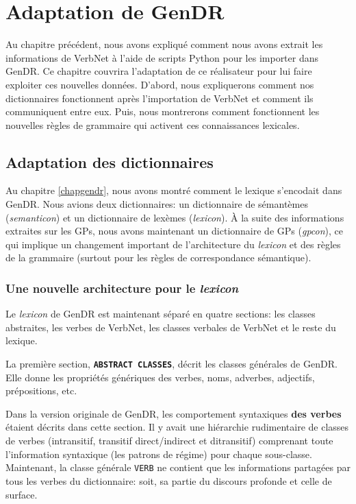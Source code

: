 
\chapter{Adaptation de GenDR}\label{ch:implementation}

Au chapitre précédent, nous avons expliqué comment nous avons extrait les informations de VerbNet à l'aide de scripts Python pour les importer dans GenDR. Ce chapitre couvrira l'adaptation de ce réalisateur pour lui faire exploiter ces nouvelles données. D'abord, nous expliquerons comment nos dictionnaires fonctionnent après l'importation de VerbNet et comment ils communiquent entre eux. Puis, nous montrerons comment fonctionnent les nouvelles règles de grammaire qui activent ces connaissances lexicales.

\section{Adaptation des dictionnaires}

Au chapitre \ref{chapgendr}, nous avons montré comment le lexique s'encodait dans GenDR. Nous avions deux dictionnaires: un dictionnaire de sémantèmes (\emph{semanticon}) et un dictionnaire de lexèmes (\emph{lexicon}). À la suite des informations extraites sur les \acp{GP}, nous avons maintenant un dictionnaire de \acp{GP} (\emph{gpcon}), ce qui implique un changement important de l'architecture du \emph{lexicon} et des règles de la grammaire (surtout pour les règles de correspondance sémantique).

\subsection{Une nouvelle architecture pour le \emph{lexicon}}

Le \emph{lexicon} de GenDR est maintenant séparé en quatre sections: les classes abstraites, les verbes de VerbNet, les classes verbales de VerbNet et le reste du lexique.

La première section, \textbf{\texttt{ABSTRACT CLASSES}}, décrit les classes générales de GenDR. Elle donne les propriétés génériques des verbes, noms, adverbes, adjectifs, prépositions, etc.

Dans la version originale de GenDR, les comportement syntaxiques \textbf{des verbes} étaient décrits dans cette section. Il y avait une hiérarchie rudimentaire de classes de verbes (intransitif, transitif direct/indirect et ditransitif) comprenant toute l'information syntaxique (les patrons de régime) pour chaque sous-classe. Maintenant, la classe générale \texttt{VERB} ne contient que les informations partagées par tous les verbes du dictionnaire: soit, sa partie du discours profonde et celle de surface. 

